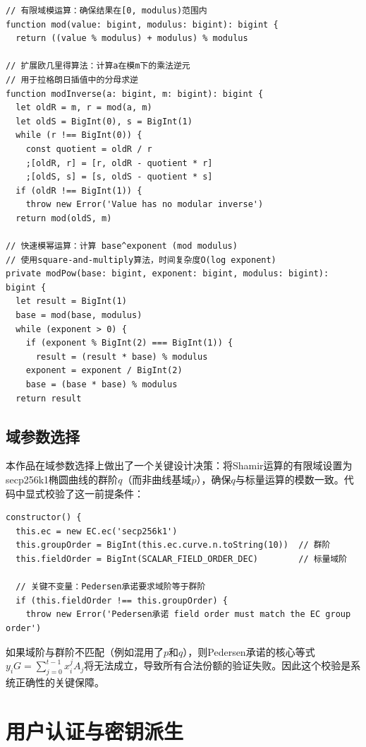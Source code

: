 \documentclass[UTF8,a4paper,zihao=-4,openany]{ctexrep}
\begin{document}
\begin{lstlisting}[caption={模运算工具函数 (shamir.ts:360-381)}]
// 有限域模运算：确保结果在[0, modulus)范围内
function mod(value: bigint, modulus: bigint): bigint {
  return ((value % modulus) + modulus) % modulus

// 扩展欧几里得算法：计算a在模m下的乘法逆元
// 用于拉格朗日插值中的分母求逆
function modInverse(a: bigint, m: bigint): bigint {
  let oldR = m, r = mod(a, m)
  let oldS = BigInt(0), s = BigInt(1)
  while (r !== BigInt(0)) {
    const quotient = oldR / r
    ;[oldR, r] = [r, oldR - quotient * r]
    ;[oldS, s] = [s, oldS - quotient * s]
  if (oldR !== BigInt(1)) {
    throw new Error('Value has no modular inverse')
  return mod(oldS, m)

// 快速模幂运算：计算 base^exponent (mod modulus)
// 使用square-and-multiply算法，时间复杂度O(log exponent)
private modPow(base: bigint, exponent: bigint, modulus: bigint): bigint {
  let result = BigInt(1)
  base = mod(base, modulus)
  while (exponent > 0) {
    if (exponent % BigInt(2) === BigInt(1)) {
      result = (result * base) % modulus
    exponent = exponent / BigInt(2)
    base = (base * base) % modulus
  return result
\end{lstlisting}

\subsection{域参数选择}

本作品在域参数选择上做出了一个关键设计决策：将Shamir运算的有限域设置为secp256k1椭圆曲线的群阶$q$（而非曲线基域$p$），确保$q$与标量运算的模数一致。代码中显式校验了这一前提条件：

\begin{lstlisting}[caption={域参数校验 (shamir.ts:68-76)}]
constructor() {
  this.ec = new EC.ec('secp256k1')
  this.groupOrder = BigInt(this.ec.curve.n.toString(10))  // 群阶
  this.fieldOrder = BigInt(SCALAR_FIELD_ORDER_DEC)        // 标量域阶

  // 关键不变量：Pedersen承诺要求域阶等于群阶
  if (this.fieldOrder !== this.groupOrder) {
    throw new Error('Pedersen承诺 field order must match the EC group order')
\end{lstlisting}

如果域阶与群阶不匹配（例如混用了$p$和$q$），则Pedersen承诺的核心等式$y_iG = \sum_{j=0}^{t-1} x_i^j A_j$将无法成立，导致所有合法份额的验证失败。因此这个校验是系统正确性的关键保障。

\section{用户认证与密钥派生}
\end{document}
